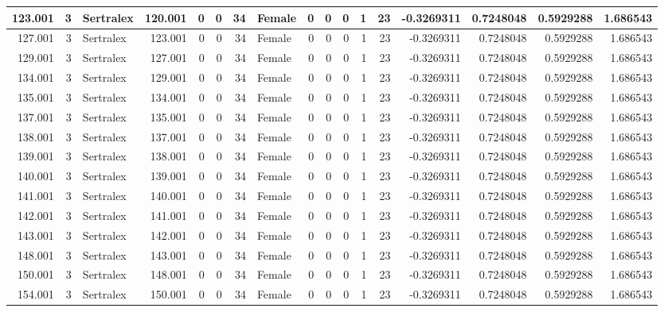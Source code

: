 \documentclass[
]{book}
\begin{document}
\begin{table}
\begin{tabular}[t]{r|r|l|r|r|r|r|l|r|r|r|r|r|r|r|r|r}
\hline
123.001 & 3 & Sertralex & 120.001 & 0 & 0 & 34 & Female & 0 & 0 & 0 & 1 & 23 & -0.3269311 & 0.7248048 & 0.5929288 & 1.686543\\
\hline
127.001 & 3 & Sertralex & 123.001 & 0 & 0 & 34 & Female & 0 & 0 & 0 & 1 & 23 & -0.3269311 & 0.7248048 & 0.5929288 & 1.686543\\
\hline
129.001 & 3 & Sertralex & 127.001 & 0 & 0 & 34 & Female & 0 & 0 & 0 & 1 & 23 & -0.3269311 & 0.7248048 & 0.5929288 & 1.686543\\
\hline
134.001 & 3 & Sertralex & 129.001 & 0 & 0 & 34 & Female & 0 & 0 & 0 & 1 & 23 & -0.3269311 & 0.7248048 & 0.5929288 & 1.686543\\
\hline
135.001 & 3 & Sertralex & 134.001 & 0 & 0 & 34 & Female & 0 & 0 & 0 & 1 & 23 & -0.3269311 & 0.7248048 & 0.5929288 & 1.686543\\
\hline
137.001 & 3 & Sertralex & 135.001 & 0 & 0 & 34 & Female & 0 & 0 & 0 & 1 & 23 & -0.3269311 & 0.7248048 & 0.5929288 & 1.686543\\
\hline
138.001 & 3 & Sertralex & 137.001 & 0 & 0 & 34 & Female & 0 & 0 & 0 & 1 & 23 & -0.3269311 & 0.7248048 & 0.5929288 & 1.686543\\
\hline
139.001 & 3 & Sertralex & 138.001 & 0 & 0 & 34 & Female & 0 & 0 & 0 & 1 & 23 & -0.3269311 & 0.7248048 & 0.5929288 & 1.686543\\
\hline
140.001 & 3 & Sertralex & 139.001 & 0 & 0 & 34 & Female & 0 & 0 & 0 & 1 & 23 & -0.3269311 & 0.7248048 & 0.5929288 & 1.686543\\
\hline
141.001 & 3 & Sertralex & 140.001 & 0 & 0 & 34 & Female & 0 & 0 & 0 & 1 & 23 & -0.3269311 & 0.7248048 & 0.5929288 & 1.686543\\
\hline
142.001 & 3 & Sertralex & 141.001 & 0 & 0 & 34 & Female & 0 & 0 & 0 & 1 & 23 & -0.3269311 & 0.7248048 & 0.5929288 & 1.686543\\
\hline
143.001 & 3 & Sertralex & 142.001 & 0 & 0 & 34 & Female & 0 & 0 & 0 & 1 & 23 & -0.3269311 & 0.7248048 & 0.5929288 & 1.686543\\
\hline
148.001 & 3 & Sertralex & 143.001 & 0 & 0 & 34 & Female & 0 & 0 & 0 & 1 & 23 & -0.3269311 & 0.7248048 & 0.5929288 & 1.686543\\
\hline
150.001 & 3 & Sertralex & 148.001 & 0 & 0 & 34 & Female & 0 & 0 & 0 & 1 & 23 & -0.3269311 & 0.7248048 & 0.5929288 & 1.686543\\
\hline
154.001 & 3 & Sertralex & 150.001 & 0 & 0 & 34 & Female & 0 & 0 & 0 & 1 & 23 & -0.3269311 & 0.7248048 & 0.5929288 & 1.686543\\

\end{tabular}
\end{table}
\end{document}
